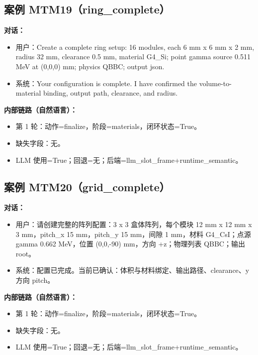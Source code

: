 \documentclass[11pt]{ctexart}
\begin{document}
\subsection{案例 MTM19（ring\_complete）}
\textbf{对话：}
\begin{itemize}
\item 用户：Create a complete ring setup: 16 modules, each 6 mm x 6 mm x 2 mm, radius 32 mm, clearance 0.5 mm, material G4\_Si; point gamma source 0.511 MeV at (0,0,0) mm; physics QBBC; output json.
\item 系统：Your configuration is complete. I have confirmed the volume-to-material binding, output path, clearance, and radius.
\end{itemize}
\textbf{内部链路（自然语言）：}
\begin{itemize}
\item 第 1 轮：动作=finalize，阶段=materials，闭环状态=True。
\item 缺失字段：无。
\item LLM 使用=True；回退=无；后端=llm\_slot\_frame+runtime\_semantic。
\end{itemize}
\subsection{案例 MTM20（grid\_complete）}
\textbf{对话：}
\begin{itemize}
\item 用户：请创建完整的阵列配置：3 x 3 盒体阵列，每个模块 12 mm x 12 mm x 3 mm，pitch\_x 15 mm，pitch\_y 15 mm，间隙 1 mm，材料 G4\_CsI；点源 gamma 0.662 MeV，位置 (0,0,-90) mm，方向 +z；物理列表 QBBC；输出 root。
\item 系统：配置已完成。当前已确认：体积与材料绑定、输出路径、clearance、y 方向 pitch。
\end{itemize}
\textbf{内部链路（自然语言）：}
\begin{itemize}
\item 第 1 轮：动作=finalize，阶段=materials，闭环状态=True。
\item 缺失字段：无。
\item LLM 使用=True；回退=无；后端=llm\_slot\_frame+runtime\_semantic。
\end{itemize}
\end{document}

